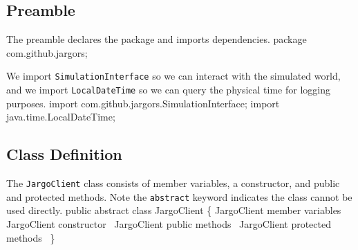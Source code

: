 \documentclass{article}
\def\nwendcode{\endtrivlist \endgroup}
\let\nwdocspar=\par
\begin{document}
\subsection{Preamble}
The preamble declares the package and imports dependencies.
\nwenddocs{}\endmoddef{}
package com.github.jargors;
\nwendcode{}\nwdocspar
We import {\tt{}SimulationInterface} so we can interact with the simulated world,
and we import {\tt{}LocalDateTime} so we can query the physical time for
logging purposes.
\nwenddocs{}\plusendmoddef
import com.github.jargors.SimulationInterface;
import java.time.LocalDateTime;
\nwendcode{}\nwdocspar

\subsection{Class Definition}
The {\tt{}JargoClient} class consists of member variables, a constructor, and
public and protected methods. Note the {\tt{}abstract} keyword indicates the class
cannot be used directly.
\nwenddocs{}\endmoddef{}
public abstract class JargoClient \{
  \LA{}\code{}JargoClient\edoc{} member variables~{\nwtagstyle{}}\RA{}
  \LA{}\code{}JargoClient\edoc{} constructor~{\nwtagstyle{}}\RA{}
  \LA{}\code{}JargoClient\edoc{} public methods~{\nwtagstyle{}}\RA{}
  \LA{}\code{}JargoClient\edoc{} protected methods~{\nwtagstyle{}}\RA{}
\}
\nwendcode{}\nwdocspar
\end{document}
